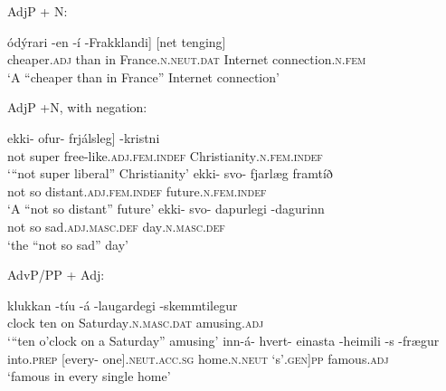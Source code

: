 \documentclass[output=paper]{LSP/langsci}
\begin{document}
\begin{xlist}
\ea%
 \label{ex:bjarnadottir:27} 
\begin{xlist}
 AdjP + N:  
\begin{xlist}
\gll {\ob}ódýrari -en  -í -Frakklandi] [net tenging]\\
 cheaper\textsc{.adj} than in France\textsc{.n.neut.dat} Internet connection\textsc{.n.fem}\\
\glt ‘A “cheaper than in France” Internet connection’
\end{xlist}\newpage
{} AdjP +N, with negation:  
\begin{xlist}
\gll {\ob}ekki- ofur- frjálsleg] -kristni\\
 not super  free-like\textsc{.adj.fem.indef} Christianity\textsc{.n.fem.indef}\\
\glt ‘“not super liberal” Christianity’
\gll ekki- svo- fjarlæg framtíð\\
 not so  distant\textsc{.adj.fem.indef} future\textsc{.n.fem.indef}\\
\glt ‘A “not so distant” future’
\gll ekki- svo- dapurlegi -dagurinn\\
 not so sad\textsc{.adj.masc.def} day\textsc{.n.masc.def}\\
\glt ‘the “not so sad” day’
\end{xlist}
 AdvP/PP + Adj:  
\begin{xlist}
\gll klukkan -tíu -á  -laugardegi  -skemmtilegur\\
 clock ten on Saturday\textsc{.n.masc.dat} amusing\textsc{.adj}\\
\glt ‘“ten o’clock on a Saturday” amusing’
 \gll inn-á- hvert- einasta -heimili -s -frægur\\
 {\ob}into\textsc{.prep} [every- one]\textsc{.neut.acc.sg} home\textsc{.n.neut} `s'\textsc{.gen}]\textsc{pp} famous\textsc{.adj}\\
\glt ‘famous in every single home’
\end{xlist}
\end{xlist}
\z


\end{xlist}
\end{document}
